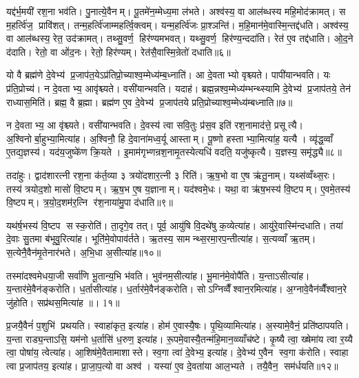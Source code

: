 यद्द॑र्भ॒मयी॑ रश॒ना भव॑ति। पु॒नात्ये॒वैनम्। पू॒तमे॑न॒म्मेध्य॒मा ल॑भते। अश्व॑स्य॒ वा आल॑ब्धस्य महि॒मोद॑क्रामत्। स म॒हर्त्वि॑ज॒ प्रावि॑शत्। तन्म॒हर्त्वि॑जाम्महर्त्वि॒क्त्वम्। यन्म॒हर्त्वि॑जः प्रा॒श्ञन्ति॑। म॒हि॒मान॑मे॒वास्मि॒न्तद्द॑धति। अश्व॑स्य॒ वा आल॑ब्धस्य॒ रेत॒ उद॑क्रामत्। तथ्सु॒वर्ण॒ हिर॑ण्यमभवत्। यथ्सु॒वर्ण॒ हिर॑ण्य॒न्ददा॑ति। रेत॑ ए॒व तद्द॑धाति। ओ॒द॒ने द॑दाति। रेतो॒ वा ओ॑द॒नः। रेतो॒ हिर॑ण्यम्। रेत॑सै॒वास्मि॒न्रेतो॑ दधाति॥६॥\anuvakamend[द॒धा॒ति॒ रु॒न्धे॒ द॒र्भा अ॑भव॒थ्षट् च॑]

यो वै ब्रह्म॑णे दे॒वेभ्य॑ प्र॒जाप॑त॒येऽप्र॑तिप्रो॒च्याश्व॒म्मेध्य॑म्ब॒ध्नाति॑। आ दे॒वताभ्यो वृश्च्यते। पापी॑यान्भवति। यः प्र॑ति॒प्रोच्य॑। न दे॒वताभ्य॒ आवृ॑श्च्यते। वसी॑यान्भवति। यदाह॑। ब्रह्म॒न्नश्व॒म्मेध्य॑म्भन्थ्स्यामि दे॒वेभ्य॑ प्र॒जाप॑तये॒ तेन॑ राध्यास॒मिति॑। ब्रह्म॒ वै ब्र॒ह्मा। ब्रह्म॑ण ए॒व दे॒वेभ्य॑ प्र॒जाप॑तये प्रति॒प्रोच्याश्व॒म्मेध्य॑म्बध्नाति॥७॥

न दे॒वताभ्य॒ आ वृ॑श्च्यते। वसी॑यान्भवति। दे॒वस्य॑ त्वा सवि॒तुः प्र॑स॒व इति॑ रश॒नामाद॑त्ते॒ प्रसूत्यै। अ॒श्विनोर्बा॒हुभ्या॒मित्या॑ह। अ॒श्विनौ॒ हि दे॒वाना॑मध्व॒र्यू आस्ताम्। पू॒ष्णो हस्ताभ्या॒मित्या॑ह॒ यत्यै। व्यृ॑द्ध॒व्वाँ ए॒तद्य॒ज्ञस्य॑। यद॑य॒जुष्के॑ण क्रि॒यते। इ॒माम॑गृभ्णन्रश॒नामृ॒तस्येत्यधि॑ वदति॒ यजु॑ष्कृत्यै। य॒ज्ञस्य॒ समृ॑द्ध्यै॥८॥

तदा॑हुः। द्वाद॑शारत्नी रश॒ना क॑र्त॒व्या ३ त्रयो॑दशार॒त्नी ३ रिति॑। ऋ॒ष॒भो वा ए॒ष ऋ॑तू॒नाम्। यथ्स॑व्वँथ्स॒रः। तस्य॑ त्रयोद॒शो मासो॑ वि॒ष्टपम्। ऋ॒ष॒भ ए॒ष य॒ज्ञानाम्। यद॑श्वमे॒धः। यथा॒ वा ऋ॑ष॒भस्य॑ वि॒ष्टपम्। ए॒वमे॒तस्य॑ वि॒ष्टपम्। त्र॒यो॒द॒शम॑र॒त्नि र॑श॒नाया॑मु॒पा द॑धाति॥९॥

यथ॑र्\mbox{}ष॒भस्य॑ वि॒ष्टप सस्क॒रोति॑। ता॒दृगे॒व तत्। पूर्व॒ आयु॑षि वि॒दथे॑षु क॒व्येत्या॑ह। आयु॑रे॒वास्मि॑न्दधाति। तया॑ दे॒वाः सु॒तमा ब॑भूवु॒रित्या॑ह। भूति॑मे॒वोपाव॑र्तते। ऋ॒तस्य॒ सामन्थ्स॒रमा॒रप॒न्तीत्या॑ह। स॒त्यव्वाँ ऋ॒तम्। स॒त्येनै॒वैन॑मृ॒तेनार॑भते। अ॒भि॒धा अ॒सीत्या॑ह॥१०॥

तस्मा॑दश्वमेधया॒जी सर्वा॑णि भू॒तान्य॒भि भ॑वति। भुव॑नम॒सीत्या॑ह। भू॒मान॑मे॒वोपै॑ति। य॒न्ताऽसीत्या॑ह। य॒न्तार॑मे॒वैन॑ङ्करोति। ध॒र्तासीत्या॑ह। ध॒र्तार॑मे॒वैन॑ङ्करोति। सोऽग्निव्वैँश्वान॒रमित्या॑ह। अ॒ग्नावे॒वैन॑व्वैँश्वान॒रे जु॑होति। सप्र॑थस॒मित्या॑ह ॥। 1१॥

प्र॒जयै॒वैनं॑ प॒शुभि॑ प्रथयति। स्वाहा॑कृत॒ इत्या॑ह। होम॑ ए॒वास्यै॒षः। पृ॒थि॒व्यामित्या॑ह। अ॒स्यामे॒वैनं॒ प्रति॑ष्ठापयति। य॒न्ता राड्य॒न्ताऽसि॒ यम॑नो ध॒र्तासि॑ ध॒रुण॒ इत्या॑ह। रू॒पमे॒वास्यै॒तन्म॑हि॒मान॒व्व्याँच॑ष्टे। कृ॒ष्यै त्वा॒ ख्षेमा॑य त्वा र॒य्यै त्वा॒ पोषा॑य॒ त्वेत्या॑ह। आ॒शिष॑मे॒वैतामाशास्ते। स्व॒गा त्वा॑ दे॒वेभ्य॒ इत्या॑ह। दे॒वेभ्य॑ ए॒वैन स्व॒गा क॑रोति। स्वाहा त्वा प्र॒जाप॑तय॒ इत्या॑ह। प्रा॒जा॒प॒त्यो वा अश्व॑। यस्या॑ ए॒व दे॒वता॑या आल॒भ्यते। तयै॒वैन॒ सम॑र्धयति॥१२॥\anuvakamend[ब॒ध्ना॒ति॒ समृ॑द्ध्या उ॒पाद॑धात्य॒सीत्या॑ह॒ सप्र॑थस॒मित्या॑ह दे॒वेभ्य॒ इत्या॑ह॒ पञ्च॑ च]


